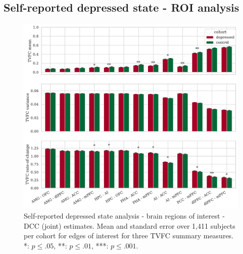 


\clearpage
\subsection{Self-reported depressed state - ROI analysis}


\begin{figure}[h]
  \centering
  \includegraphics[width=\textwidth]{fig/ukbiobank/TVFC_predictions_summaries/self_reported_depression_state/cohort_comparison/ROI/correlation_all_TVFC_summary_measures_DCC_joint_edges_of_interest}
  \caption{
    Self-reported depressed state analysis - brain regions of interest - DCC (joint) estimates.
    Mean and standard error over 1,411 subjects per cohort for edges of interest for three TVFC summary measures.
    *: $p \leq .05$, **: $p \leq .01$, ***: $p \leq .001$.
  }\label{fig:ukb-results-srds-roi-cohort-comparison-edges-of-interest-dcc-j}
\end{figure}


